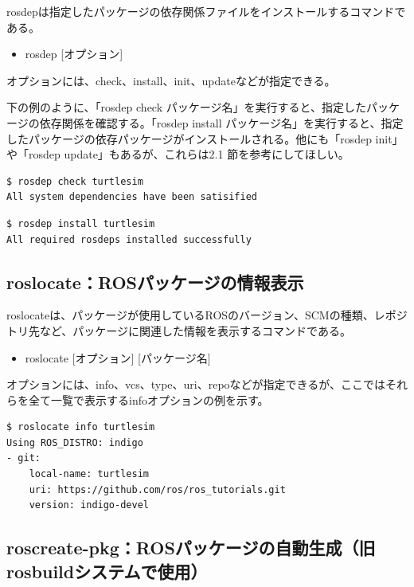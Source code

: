 rosdepは指定したパッケージの依存関係ファイルをインストールするコマンドである。

\begin{itemize}
\item  rosdep [オプション]
\end{itemize}

オプションには、check、install、init、updateなどが指定できる。

下の例のように、「rosdep check パッケージ名」を実行すると、指定したパッケージの依存関係を確認する。「rosdep install パッケージ名」を実行すると、指定したパッケージの依存パッケージがインストールされる。他にも「rosdep init」や「rosdep update」もあるが、これらは2.1 節を参考にしてほしい。

\begin{lstlisting}[language=ROS]
$ rosdep check turtlesim
All system dependencies have been satisified
\end{lstlisting}

\begin{lstlisting}[language=ROS]
$ rosdep install turtlesim
All required rosdeps installed successfully
\end{lstlisting}

\subsection{roslocate：ROSパッケージの情報表示}

roslocateは、パッケージが使用しているROSのバージョン、SCMの種類、レポジトリ先など、パッケージに関連した情報を表示するコマンドである。

\begin{itemize}
\item roslocate [オプション] [パッケージ名]
\end{itemize}

オプションには、info、vcs、type、uri、repoなどが指定できるが、ここではそれらを全て一覧で表示するinfoオプションの例を示す。

\begin{lstlisting}[language=ROS]
$ roslocate info turtlesim
Using ROS_DISTRO: indigo
- git:
    local-name: turtlesim
    uri: https://github.com/ros/ros_tutorials.git
    version: indigo-devel
\end{lstlisting}

\subsection{roscreate-pkg：ROSパッケージの自動生成（旧rosbuildシステムで使用）}

